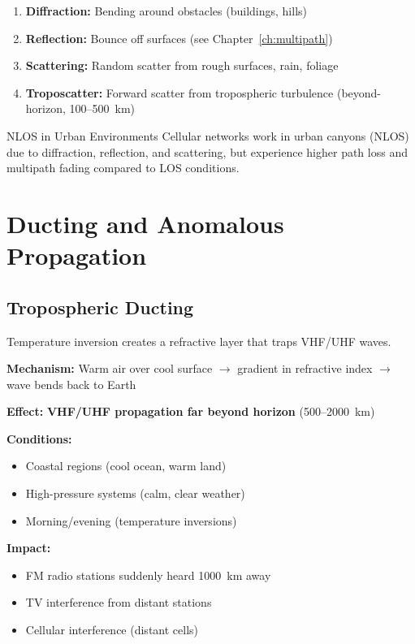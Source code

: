 \begin{enumerate}
\item \textbf{Diffraction:} Bending around obstacles (buildings, hills)
\item \textbf{Reflection:} Bounce off surfaces (see Chapter~\ref{ch:multipath})
\item \textbf{Scattering:} Random scatter from rough surfaces, rain, foliage
\item \textbf{Troposcatter:} Forward scatter from tropospheric turbulence (beyond-horizon, 100--500~km)
\end{enumerate}

\begin{calloutbox}{NLOS in Urban Environments}
Cellular networks work in urban canyons (NLOS) due to diffraction, reflection, and scattering, but experience higher path loss and multipath fading compared to LOS conditions.
\end{calloutbox}

\section{Ducting and Anomalous Propagation}

\subsection{Tropospheric Ducting}

Temperature inversion creates a refractive layer that traps VHF/UHF waves.

\textbf{Mechanism:} Warm air over cool surface $\rightarrow$ gradient in refractive index $\rightarrow$ wave bends back to Earth

\textbf{Effect:} \textbf{VHF/UHF propagation far beyond horizon} (500--2000~km)

\textbf{Conditions:}
\begin{itemize}
\item Coastal regions (cool ocean, warm land)
\item High-pressure systems (calm, clear weather)
\item Morning/evening (temperature inversions)
\end{itemize}

\textbf{Impact:}
\begin{itemize}
\item FM radio stations suddenly heard 1000~km away
\item TV interference from distant stations
\item Cellular interference (distant cells)
\end{itemize}

